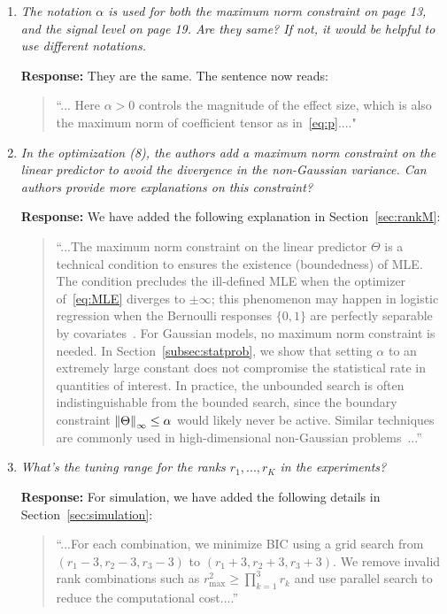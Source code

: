 \documentclass[11pt]{article}
\theoremstyle{plain}
\theoremstyle{definition}
\begin{document}
\begin{enumerate}
     \item \textit{The notation $\alpha$ is used for both the maximum norm constraint on page 13, and the signal level on page 19. Are they same? If not, it would be helpful to use different notations.}
        
         \textbf{Response:} 
        They are the same. The sentence now reads:
         \begin{quote}
             ``... Here $\alpha>0$ controls the magnitude of the effect size, which is also the maximum norm of coefficient tensor as in~\eqref{eq:p}...."
         \end{quote}
         
    \item \textit{In the optimization (8), the authors add a maximum norm constraint on the linear predictor to avoid the divergence in the non-Gaussian variance. Can authors provide more explanations on this constraint? } 
    
    \textbf{Response:} We have added the following explanation in Section~\ref{sec:rankM}:
    \begin{quote}
       ``...The maximum norm constraint on the linear predictor $\Theta$ is a technical condition to ensures the existence (boundedness) of MLE. 
The condition precludes the ill-defined MLE when the optimizer of~\eqref{eq:MLE} diverges to $\pm \infty$; this phenomenon may happen in logistic regression when the Bernoulli responses $\{0,1\}$ are perfectly separable by covariates~\citep{wang2020learning}. For Gaussian models, no maximum norm constraint is needed. In Section~\ref{subsec:statprob}, we show that setting $\alpha$ to an extremely large constant does not compromise the statistical rate in quantities of interest. In practice, the unbounded search is often indistinguishable from the bounded search, since the boundary constraint $\left\lVert\Theta\right\rVert_{\infty} \leq \alpha$ would likely never be active. Similar techniques are commonly used in high-dimensional non-Gaussian problems~\citep{wang2020learning,han2020optimal}...''
    \end{quote}
    
     \item \textit{What’s the tuning range for the ranks $r_1,...,r_K$ in the experiments?}
     
     \textbf{Response:} 
     For simulation, we have added the following details in Section~\ref{sec:simulation}:
     \begin{quote}
         ``...For each combination, we minimize BIC using a grid search from $(r_1-3, r_2-3, r_3-3)$ to $(r_1+3, r_2+3, r_3+3)$. We remove invalid rank combinations such as $r^2_{\max} \geq \prod_{k=1}^3 r_k$ and use parallel search to reduce the computational cost....'' 
     \end{quote}
         

\end{enumerate}
\end{document}
